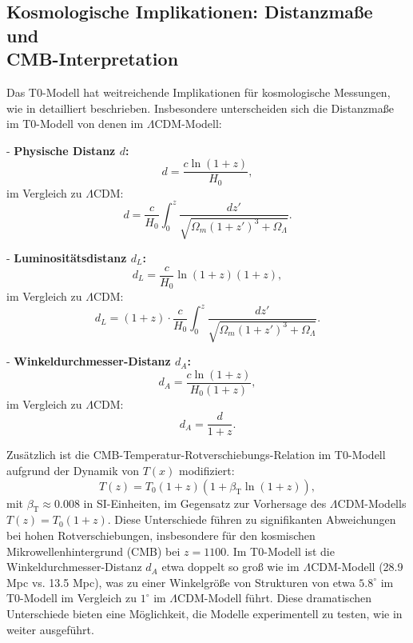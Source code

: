 \documentclass[12pt,a4paper]{article}
\newcommand{\Tfield}{T(x)}
\newcommand{\betaT}{\beta_{\text{T}}}
\begin{document}
	\subsection{Kosmologische Implikationen: Distanzmaße und\\ CMB-Interpretation}
	Das T0-Modell hat weitreichende Implikationen für kosmologische Messungen, wie in \cite{pascher_messdifferenzen_2025} detailliert beschrieben. Insbesondere unterscheiden sich die Distanzmaße im T0-Modell von denen im \(\Lambda\)CDM-Modell:
	
	- \textbf{Physische Distanz \( d \):}
	\[
	d = \frac{c \ln(1 + z)}{H_0},
	\]
	im Vergleich zu \(\Lambda\)CDM:
	\[
	d = \frac{c}{H_0} \int_0^z \frac{dz'}{\sqrt{\Omega_m (1 + z')^3 + \Omega_\Lambda}}.
	\]
	
	- \textbf{Luminositätsdistanz \( d_L \):}
	\[
	d_L = \frac{c}{H_0} \ln(1 + z) (1 + z),
	\]
	im Vergleich zu \(\Lambda\)CDM:
	\[
	d_L = (1 + z) \cdot \frac{c}{H_0} \int_0^z \frac{dz'}{\sqrt{\Omega_m (1 + z')^3 + \Omega_\Lambda}}.
	\]
	
	- \textbf{Winkeldurchmesser-Distanz \( d_A \):}
	\[
	d_A = \frac{c \ln(1 + z)}{H_0 (1 + z)},
	\]
	im Vergleich zu \(\Lambda\)CDM:
	\[
	d_A = \frac{d}{1 + z}.
	\]
	
	Zusätzlich ist die CMB-Temperatur-Rotverschiebungs-Relation im T0-Modell aufgrund der Dynamik von \( \Tfield \) modifiziert:
	\begin{equation}
		T(z) = T_0 (1 + z) (1 + \betaT \ln(1 + z)),
	\end{equation}
	mit \( \betaT \approx 0.008 \) in SI-Einheiten, im Gegensatz zur Vorhersage des \(\Lambda\)CDM-Modells \( T(z) = T_0 (1 + z) \). Diese Unterschiede führen zu signifikanten Abweichungen bei hohen Rotverschiebungen, insbesondere für den kosmischen Mikrowellenhintergrund (CMB) bei \( z = 1100 \). Im T0-Modell ist die Winkeldurchmesser-Distanz \( d_A \) etwa doppelt so groß wie im \(\Lambda\)CDM-Modell (28.9 Mpc vs. 13.5 Mpc), was zu einer Winkelgröße von Strukturen von etwa \( 5.8^\circ \) im T0-Modell im Vergleich zu \( 1^\circ \) im \(\Lambda\)CDM-Modell führt. Diese dramatischen Unterschiede bieten eine Möglichkeit, die Modelle experimentell zu testen, wie in \cite{pascher_messdifferenzen_2025} weiter ausgeführt.
	
\end{document}
